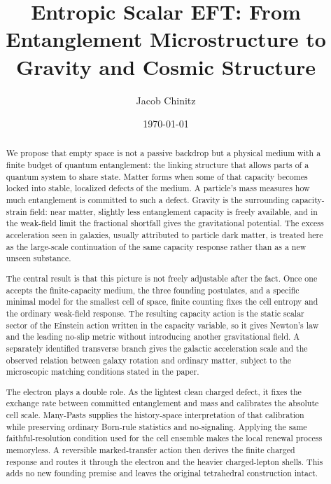 \documentclass[11pt]{article}
\author{Jacob Chinitz}
\title{Entropic Scalar EFT: From Entanglement Microstructure to Gravity and Cosmic Structure}
\date{\today}
\begin{document}
\maketitle

\begin{abstract}
\indent We propose that empty space is not a passive backdrop but a physical medium with a finite budget of quantum entanglement: the linking structure that allows parts of a quantum system to share state. Matter forms when some of that capacity becomes locked into stable, localized defects of the medium. A particle's mass measures how much entanglement is committed to such a defect. Gravity is the surrounding capacity-strain field: near matter, slightly less entanglement capacity is freely available, and in the weak-field limit the fractional shortfall gives the gravitational potential. The excess acceleration seen in galaxies, usually attributed to particle dark matter, is treated here as the large-scale continuation of the same capacity response rather than as a new unseen substance.

\indent The central result is that this picture is not freely adjustable after the fact. Once one accepts the finite-capacity medium, the three founding postulates, and a specific minimal model for the smallest cell of space, finite counting fixes the cell entropy and the ordinary weak-field response. The resulting capacity action is the static scalar sector of the Einstein action written in the capacity variable, so it gives Newton's law and the leading no-slip metric without introducing another gravitational field. A separately identified transverse branch gives the galactic acceleration scale and the observed relation between galaxy rotation and ordinary matter, subject to the microscopic matching conditions stated in the paper.

\indent The electron plays a double role. As the lightest clean charged defect, it fixes the exchange rate between committed entanglement and mass and calibrates the absolute cell scale. Many-Pasts supplies the history-space interpretation of that calibration while preserving ordinary Born-rule statistics and no-signaling. Applying the same faithful-resolution condition used for the cell ensemble makes the local renewal process memoryless. A reversible marked-transfer action then derives the finite charged response and routes it through the electron and the heavier charged-lepton shells. This adds no new founding premise and leaves the original tetrahedral construction intact.


\end{abstract}
\end{document}
